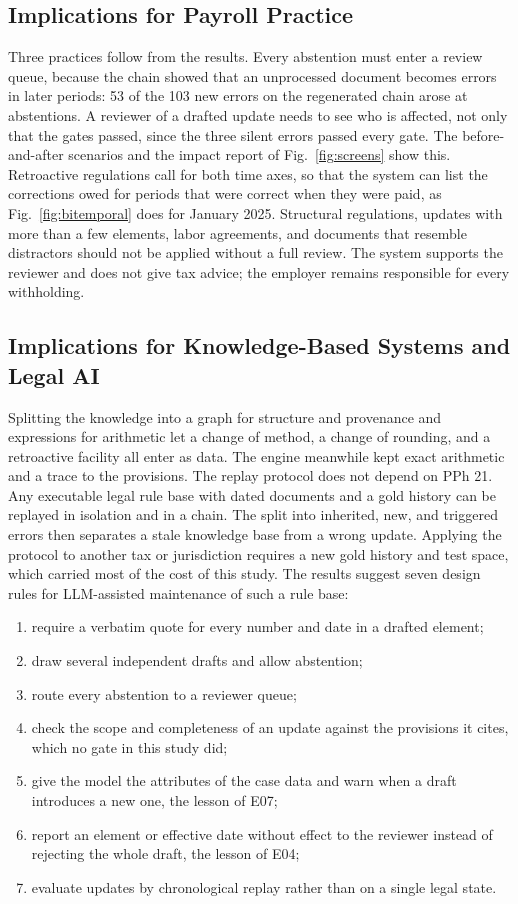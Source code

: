 \subsection{Implications for Payroll Practice}
Three practices follow from the results. Every abstention must enter a review queue, because the chain showed that an unprocessed document becomes errors in later periods: 53 of the 103 new errors on the regenerated chain arose at abstentions. A reviewer of a drafted update needs to see who is affected, not only that the gates passed, since the three silent errors passed every gate. The before-and-after scenarios and the impact report of Fig.~\ref{fig:screens} show this. Retroactive regulations call for both time axes, so that the system can list the corrections owed for periods that were correct when they were paid, as Fig.~\ref{fig:bitemporal} does for January 2025. Structural regulations, updates with more than a few elements, labor agreements, and documents that resemble distractors should not be applied without a full review. The system supports the reviewer and does not give tax advice; the employer remains responsible for every withholding.

\subsection{Implications for Knowledge-Based Systems and Legal AI}
Splitting the knowledge into a graph for structure and provenance and expressions for arithmetic let a change of method, a change of rounding, and a retroactive facility all enter as data. The engine meanwhile kept exact arithmetic and a trace to the provisions. The replay protocol does not depend on PPh 21. Any executable legal rule base with dated documents and a gold history can be replayed in isolation and in a chain. The split into inherited, new, and triggered errors then separates a stale knowledge base from a wrong update. Applying the protocol to another tax or jurisdiction requires a new gold history and test space, which carried most of the cost of this study. The results suggest seven design rules for LLM-assisted maintenance of such a rule base:
\begin{enumerate}
\item require a verbatim quote for every number and date in a drafted element;
\item draw several independent drafts and allow abstention;
\item route every abstention to a reviewer queue;
\item check the scope and completeness of an update against the provisions it cites, which no gate in this study did;
\item give the model the attributes of the case data and warn when a draft introduces a new one, the lesson of E07;
\item report an element or effective date without effect to the reviewer instead of rejecting the whole draft, the lesson of E04;
\item evaluate updates by chronological replay rather than on a single legal state.
\end{enumerate}


